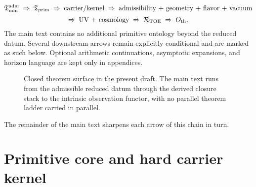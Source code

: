 \begin{tcolorbox}[colback=tfptorange!4, colframe=tfptorange!80!black, breakable,
    title={Closed Theorem Stack in the Present Version}, colbacktitle=tfptorange!85!black]
\begin{gather*}
\mathfrak T_{\mathrm{min}}^{\mathrm{adm}}
\;\Rightarrow\;
\mathfrak T_{\mathrm{prim}}
\;\Rightarrow\;
\text{carrier/kernel}
\;\Rightarrow\;
\text{admissibility + geometry + flavor + vacuum}\\[2pt]
\Rightarrow\;
\text{UV + cosmology}
\;\Rightarrow\;
\mathcal R_{\mathrm{TOE}}
\;\Rightarrow\;
O_{\mathrm{th}}.
\end{gather*}
The main text contains no additional primitive ontology beyond the reduced datum.
Several downstream arrows remain explicitly conditional and are marked as such below.
Optional arithmetic continuations, asymptotic expansions, and horizon language are kept only in appendices.
\end{tcolorbox}

\begin{figure}[t]
\centering
\scriptsize
{}
\caption{Closed theorem surface in the present draft. The main text runs from the admissible
reduced datum through the derived closure stack to the intrinsic observation functor, with no
parallel theorem ladder carried in parallel.}
\label{fig:status-ladder}
\end{figure}

The remainder of the main text sharpens each arrow of this chain in turn.

\section{Primitive core and hard carrier kernel}

